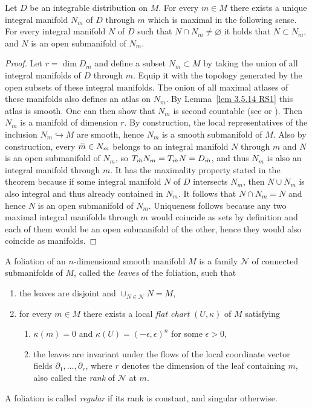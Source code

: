 \begin{thm}[{{\cite[Thm.~3.5.17]{RS1}}}]\label{thm 3.5.17 RS1}
    Let $D$ be an integrable distribution on $M$. For every $m\in M$ there exists a unique integral manifold $N_m$ of $D$ through $m$ which is maximal in the following sense. For every integral manifold $N$ of $D$ such that $N\cap N_m\neq \varnothing$ it holds that $N\subset N_m$, and $N$ is an open submanifold of $N_m$.
\end{thm}
\begin{proof}
    Let $r=\dim D_m$ and define a subset $N_m\subset M$ by taking the union of all integral manifolds of $D$ through $m$. Equip it with the topology generated by the open subsets of these integral manifolds. The onion of all maximal atlases of these manifolds also defines an atlas on $N_m$. By Lemma~\ref{lem 3.5.14 RS1} this atlas is smooth.  One can then show that $N_m$ is second countable (see \cite[Lem.~19.22]{Lee} or \cite[Thm.~1.64]{Warner}). Then $N_m$ is a manifold of dimension $r$. By construction, the local representatives of the inclusion $N_m\hookrightarrow M$ are smooth, hence $N_m$ is a smooth submanifold of $M$. Also by construction, every $\wt{m}\in N_m$ belongs to an integral manifold $N$ through $m$ and $N$ is an open submanifold of $N_m$, so $T_{\wt m}N_m=T_{\wt m}N=D_{\wt m}$, and thus $N_m$ is also an integral manifold through $m$. It has the maximality property stated in the theorem because if some integral manifold $N$ of $D$ intersects $N_m$, then $N\cup N_m$ is also integral and thus already contained in $N_m$. It follows that $N\cap N_m=N$ and hence $N$ is an open submanifold of $N_m$. Uniqueness follows because any two maximal integral manifolds through $m$ would coincide as sets by definition and each of them would be an open submanifold of the other, hence they would also coincide as manifolds.
\end{proof}


\begin{defn}[Foliation]
    A foliation of an $n$-dimensional smooth manifold $M$ is a family $\mathcal{N}$ of connected submanifolds of $M$, called the \emph{leaves} of the foliation, such that
    \begin{enumerate}
        \item the leaves are disjoint and $\cup_{N\in\mathcal{N}}N=M$,
        \item for every $m\in M$ there exists a local \emph{flat chart} $(U,\kappa)$ of $M$ satisfying
        \begin{enumerate}[label=(\alph*)]
            \item $\kappa(m)=0$ and $\kappa(U)=(-\epsilon,\epsilon)^n$ for some $\epsilon>0$,
            \item the leaves are invariant under the flows of the local coordinate vector fields $\partial_1,\dots,\partial_r$, where $r$ denotes the dimension of the leaf containing $m$, also called the \emph{rank} of $\mathcal{N}$ at $m$.
        \end{enumerate}
    \end{enumerate}
    A foliation is called \emph{regular} if its rank is constant, and singular otherwise.
\end{defn}




